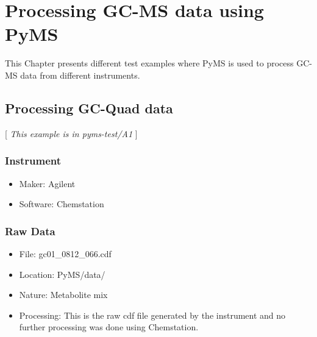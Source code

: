 

\appendix
{}
\chapter{Processing GC-MS data using PyMS}

This Chapter presents different test examples where PyMS is used to process GC-MS 
data from different instruments. 


\section{Processing GC-Quad data}

[ {\em This example is in pyms-test/A1} ]

\subsection{Instrument}
\noindent

\begin{itemize}
  \item Maker: Agilent
  \item Software: Chemstation
\end{itemize}

\subsection{Raw Data}
\noindent

\begin{itemize}
  \item File:  gc01\_0812\_066.cdf
  \item Location: PyMS/data/
  \item Nature: Metabolite mix
  \item Processing: This is the raw cdf file generated by the instrument and no further 
   processing was done using Chemstation. 
\end{itemize}


